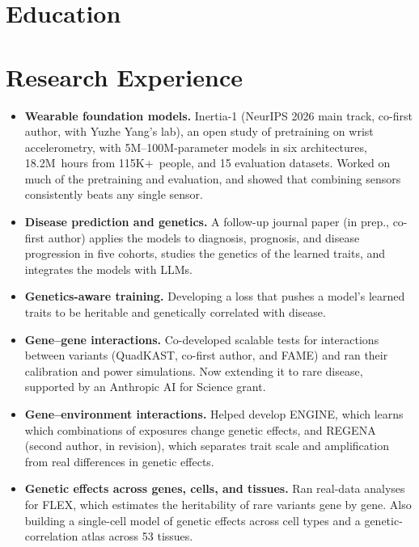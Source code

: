 \documentclass[10pt,letterpaper]{article}
\begin{document}
\header

\section{Education}

\section{Research Experience}

\begin{itemize}
  \item \textbf{Wearable foundation models.} Inertia-1 (NeurIPS 2026 main track, co-first author, with Yuzhe Yang's lab), an open study of
    pretraining on wrist accelerometry, with 5M--100M-parameter models in six architectures, 18.2M~hours from
    115K+~people, and 15 evaluation datasets. Worked on much of the pretraining and evaluation, and showed that
    combining sensors consistently beats any single sensor.
  \item \textbf{Disease prediction and genetics.} A follow-up journal paper (in prep., co-first author) applies the models
    to diagnosis, prognosis, and disease progression in five cohorts, studies the genetics of the learned traits, and
    integrates the models with LLMs.
  \item \textbf{Genetics-aware training.} Developing a loss that pushes a model's learned traits to be heritable and genetically
    correlated with disease.
\end{itemize}

\begin{itemize}
  \item \textbf{Gene--gene interactions.} Co-developed scalable tests for interactions between variants (QuadKAST, co-first
    author, and FAME) and ran their calibration and power simulations. Now extending it to rare disease,
    supported by an Anthropic AI for Science grant.
  \item \textbf{Gene--environment interactions.} Helped develop ENGINE, which learns which combinations of exposures
    change genetic effects, and REGENA (second author, in revision), which separates trait scale and amplification from
    real differences in genetic effects.
  \item \textbf{Genetic effects across genes, cells, and tissues.} Ran real-data analyses for FLEX, which estimates the
    heritability of rare variants gene by gene. Also building a single-cell model of genetic effects across cell
    types and a genetic-correlation atlas across 53 tissues.
\end{itemize}
\end{document}
